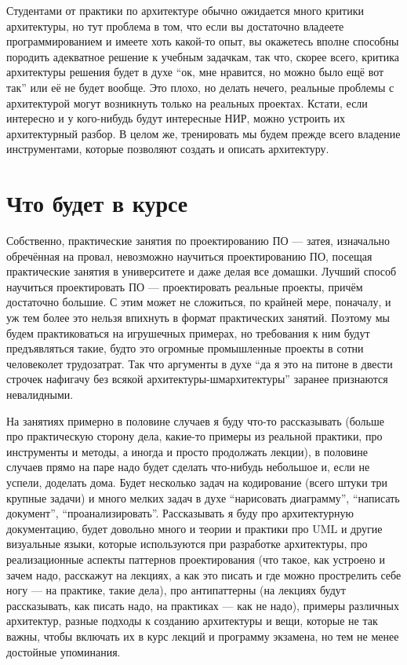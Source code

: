 \documentclass[a5paper]{article}
\begin{document}
Студентами от практики по архитектуре обычно ожидается много критики архитектуры, но тут проблема в том, что если вы достаточно владеете программированием и имеете хоть какой-то опыт, вы окажетесь вполне способны породить адекватное решение к учебным задачкам, так что, скорее всего, критика архитектуры решения будет в духе ``ок, мне нравится, но можно было ещё вот так'' или её не будет вообще. Это плохо, но делать нечего, реальные проблемы с архитектурой могут возникнуть только на реальных проектах. Кстати, если интересно и у кого-нибудь будут интересные НИР, можно устроить их архитектурный разбор. В целом же, тренировать мы будем прежде всего владение инструментами, которые позволяют создать и описать архитектуру.

\section{Что будет в курсе}

Собственно, практические занятия по проектированию ПО --- затея, изначально обречённая на провал, невозможно научиться проектированию ПО, посещая практические занятия в университете и даже делая все домашки. Лучший способ научиться проектировать ПО --- проектировать реальные проекты, причём достаточно большие. С этим может не сложиться, по крайней мере, поначалу, и уж тем более это нельзя впихнуть в формат практических занятий. Поэтому мы будем практиковаться на игрушечных примерах, но требования к ним будут предъявляться такие, будто это огромные промышленные проекты в сотни человеколет трудозатрат. Так что аргументы в духе ``да я это на питоне в двести строчек нафигачу без всякой архитектуры-шмархитектуры'' заранее признаются невалидными. 

На занятиях примерно в половине случаев я буду что-то рассказывать (больше про практическую сторону дела, какие-то примеры из реальной практики, про инструменты и методы, а иногда и просто продолжать лекции), в половине случаев прямо на паре надо будет сделать что-нибудь небольшое и, если не успели, доделать дома. Будет несколько задач на кодирование (всего штуки три крупные задачи) и много мелких задач в духе ``нарисовать диаграмму'', ``написать документ'', ``проанализировать''. Рассказывать я буду про архитектурную документацию, будет довольно много и теории и практики про UML и другие визуальные языки, которые используются при разработке архитектуры, про реализационные аспекты паттернов проектирования (что такое, как устроено и зачем надо, расскажут на лекциях, а как это писать и где можно прострелить себе ногу --- на практике, такие дела), про антипаттерны (на лекциях будут рассказывать, как писать надо, на практиках --- как не надо), примеры различных архитектур, разные подходы к созданию архитектуры и вещи, которые не так важны, чтобы включать их в курс лекций и программу экзамена, но тем не менее достойные упоминания.
\end{document}
